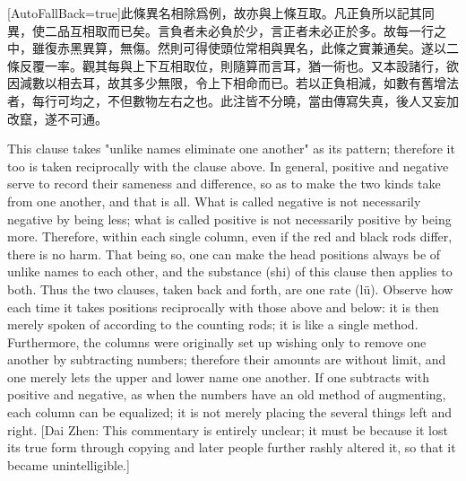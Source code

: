 \documentclass[11pt]{article}
\newcommand{\zhsmall}{\footnotesize\color{black!70}}
\newcommand{\unitlabel}[1]{\marginpar{\raggedleft\tiny\color{gray}#1}}
\newenvironment{unitzh}{\par\CJKfontspec{Noto Serif CJK SC}[AutoFallBack=true]\large\linespread{1.25}\selectfont}{\par}
\newenvironment{uniten}{\par\small\color{black!85}}{\par\medskip}
\begin{document}
\begin{unitzh}\unitlabel{jiuzhang-036.8}此條異名相除爲例，故亦與上條互取。凡正負所以記其同異，使二品互相取而已矣。言負者未必負於少，言正者未必正於多。故每一行之中，雖復赤黑異算，無傷。然則可得使頭位常相與異名，此條之實兼通矣。遂以二條反覆一率。觀其每與上下互相取位，則隨算而言耳，猶一術也。又本設諸行，欲因減數以相去耳，故其多少無限，令上下相命而已。若以正負相減，如數有舊增法者，每行可均之，不但數物左右之也。{\zhsmall 此注皆不分曉，當由傳寫失真，後人又妄加改竄，遂不可通。}\end{unitzh}
\begin{uniten}This clause takes "unlike names eliminate one another" as its pattern; therefore it too is taken reciprocally with the clause above. In general, positive and negative serve to record their sameness and difference, so as to make the two kinds take from one another, and that is all. What is called negative is not necessarily negative by being less; what is called positive is not necessarily positive by being more. Therefore, within each single column, even if the red and black rods differ, there is no harm. That being so, one can make the head positions always be of unlike names to each other, and the substance (shi) of this clause then applies to both. Thus the two clauses, taken back and forth, are one rate (lü). Observe how each time it takes positions reciprocally with those above and below: it is then merely spoken of according to the counting rods; it is like a single method. Furthermore, the columns were originally set up wishing only to remove one another by subtracting numbers; therefore their amounts are without limit, and one merely lets the upper and lower name one another. If one subtracts with positive and negative, as when the numbers have an old method of augmenting, each column can be equalized; it is not merely placing the several things left and right. [Dai Zhen: This commentary is entirely unclear; it must be because it lost its true form through copying and later people further rashly altered it, so that it became unintelligible.]\end{uniten}
\end{document}
